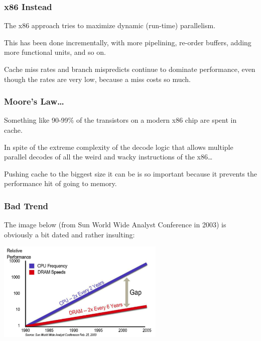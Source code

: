 \begin{frame}
\frametitle{x86 Instead}

The x86 approach tries to maximize dynamic (run-time) parallelism. 

This has been done incrementally, with more pipelining, re-order buffers, adding more functional units, and so on. 

Cache miss rates and branch mispredicts continue to dominate performance, even though the rates are very low, because a miss costs so much. 

\end{frame}



\begin{frame}
\frametitle{Moore's Law\ldots}

Something like 90-99\% of the transistors on a modern x86 chip are spent in cache. 

In spite of the extreme complexity of the decode logic that allows multiple parallel decodes of all the weird and wacky instructions of the x86\ldots

Pushing cache to the biggest size it can be is so important because it prevents the performance hit of going to memory.


\end{frame}



\begin{frame}
\frametitle{Bad Trend}

The image below (from Sun World Wide Analyst Conference in 2003) is obviously a bit dated and rather insulting:
\begin{center}
\includegraphics[width=0.6\textwidth]{images/ram-vs-cpu.png}
\end{center}

\end{frame}



